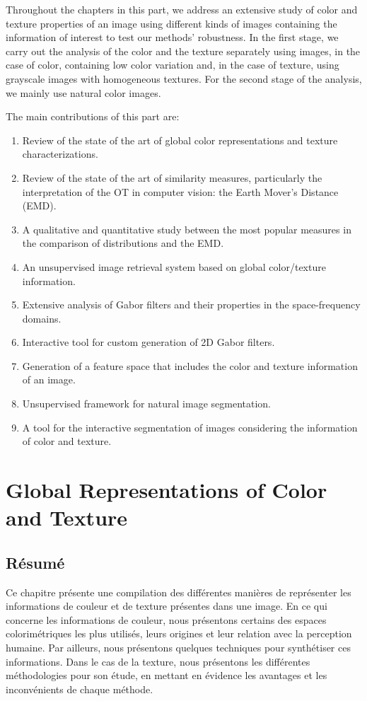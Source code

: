 Throughout the chapters in this part, we address an extensive study of color and texture properties of an image using different kinds of images containing the information of interest to test our methods' robustness. In the first stage, we carry out the analysis of the color and the texture separately using images, in the case of color, containing low color variation and, in the case of texture, using grayscale images with homogeneous textures. For the second stage of the analysis, we mainly use natural color images. 

The main contributions of this part are:
\begin{enumerate}
	\item Review of the state of the art of global color representations and texture characterizations.
	\item Review of the state of the art of similarity measures, particularly the interpretation of the OT in computer vision: the Earth Mover's Distance (EMD).
	\item A qualitative and quantitative study between the most popular measures in the comparison of distributions and the EMD. 
	\item An unsupervised image retrieval system based on global color/texture information.
	\item Extensive analysis of Gabor filters and their properties in the space-frequency domains.
	\item Interactive tool for custom generation of 2D Gabor filters.
	\item Generation of a feature space that includes the color and texture information of an image.
	\item Unsupervised framework for natural image segmentation.
	\item A tool for the interactive segmentation of images considering the information of color and texture.
\end{enumerate}


\chapter{Global Representations of Color and Texture } \label{ch:color_texure_representations}

\section*{Résumé}
\noindent 
Ce chapitre présente une compilation des différentes manières de représenter les informations de couleur et de texture présentes dans une image. En ce qui concerne les informations de couleur, nous présentons certains des espaces colorimétriques les plus utilisés, leurs origines et leur relation avec la perception humaine. Par ailleurs, nous présentons quelques techniques pour synthétiser ces informations. Dans le cas de la texture, nous présentons les différentes méthodologies pour son étude, en mettant en évidence les avantages et les inconvénients de chaque méthode.
